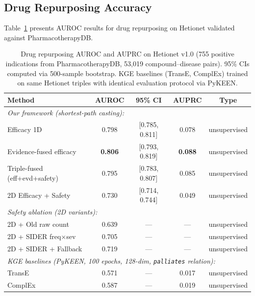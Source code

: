 \documentclass[11pt,a4paper]{article}
\begin{document}
\subsection{Drug Repurposing Accuracy}
\label{sec:results:auroc}

Table~\ref{tab:auroc} presents AUROC results for drug repurposing on
Hetionet validated against PharmacotherapyDB.

\begin{table}[t]
\centering
\caption{Drug repurposing AUROC and AUPRC on Hetionet v1.0 (755
positive indications from PharmacotherapyDB, 53{,}019 compound--disease
pairs). 95\% CIs computed via 500-sample bootstrap. KGE baselines
(TransE, ComplEx) trained on same Hetionet triples with identical
evaluation protocol via PyKEEN.}
\label{tab:auroc}
\begin{tabular}{lcccc}
\toprule
\textbf{Method} & \textbf{AUROC} & \textbf{95\% CI} & \textbf{AUPRC} & \textbf{Type} \\
\midrule
\multicolumn{5}{l}{\textit{Our framework (shortest-path casting):}} \\
Efficacy 1D                 & 0.798 & [0.785, 0.811] & 0.078 & unsupervised \\
Evidence-fused efficacy     & \textbf{0.806} & [0.793, 0.819] & \textbf{0.088} & unsupervised \\
Triple-fused (eff+evd+safety) & 0.795 & [0.783, 0.807] & 0.085 & unsupervised \\
2D Efficacy + Safety         & 0.730 & [0.714, 0.744] & 0.049 & unsupervised \\
\midrule
\multicolumn{5}{l}{\textit{Safety ablation (2D variants):}} \\
2D + Old raw count          & 0.639 & --- & --- & unsupervised \\
2D + SIDER freq$\times$sev  & 0.705 & --- & --- & unsupervised \\
2D + SIDER + Fallback       & 0.719 & --- & --- & unsupervised \\
\midrule
\multicolumn{5}{l}{\textit{KGE baselines (PyKEEN, 100 epochs, 128-dim, \texttt{palliates} relation):}} \\
TransE  \citep{bordes2013translating}  & 0.571 & --- & 0.017 & unsupervised \\
ComplEx \citep{trouillon2016complex}   & 0.587 & --- & 0.019 & unsupervised \\
\bottomrule
\end{tabular}
\end{table}
\end{document}

